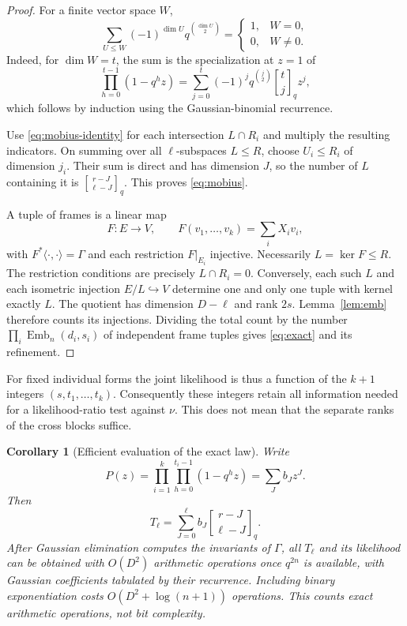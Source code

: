\documentclass[11pt,letterpaper]{article}
\newtheorem{corollary}[theorem]{Corollary}
\theoremstyle{definition}
\theoremstyle{remark}
\newcommand{\Emb}{\operatorname{Emb}}
\newcommand{\qb}[2]{\genfrac{[}{]}{0pt}{}{#1}{#2}_{q}}
\begin{document}
\begin{proof}
For a finite vector space $W$,
\begin{equation}\label{eq:mobius-identity}
 \sum_{U\le W}(-1)^{\dim U}q^{\binom{\dim U}2}
 =\begin{cases}1,&W=0,\\0,&W\ne0.\end{cases}
\end{equation}
Indeed, for $\dim W=t$, the sum is the specialization at $z=1$ of
\[
 \prod_{h=0}^{t-1}(1-q^h z)
 =\sum_{j=0}^t(-1)^jq^{\binom j2}\qb tjz^j,
\]
which follows by induction using the Gaussian-binomial recurrence.

Use \eqref{eq:mobius-identity} for each intersection $L\cap R_i$ and multiply the resulting indicators. On summing over all $\ell$-subspaces $L\le R$, choose $U_i\le R_i$ of dimension $j_i$. Their sum is direct and has dimension $J$, so the number of $L$ containing it is $\qb{r-J}{\ell-J}$. This proves \eqref{eq:mobius}.

A tuple of frames is a linear map
\[
 F:E\longrightarrow V,\qquad F(v_1,\ldots,v_k)=\sum_iX_i v_i,
\]
with $F^*\langle\cdot,\cdot\rangle=\Gamma$ and each restriction $F|_{E_i}$ injective. Necessarily $L=\ker F\le R$. The restriction conditions are precisely $L\cap R_i=0$. Conversely, each such $L$ and each isometric injection $E/L\hookrightarrow V$ determine one and only one tuple with kernel exactly $L$. The quotient has dimension $D-\ell$ and rank $2s$. Lemma~\ref{lem:emb} therefore counts its injections. Dividing the total count by the number $\prod_i\Emb_n(d_i,s_i)$ of independent frame tuples gives \eqref{eq:exact} and its refinement.
\end{proof}

For fixed individual forms the joint likelihood is thus a function of the $k+1$ integers $(s,t_1,\ldots,t_k)$. Consequently these integers retain all information needed for a likelihood-ratio test against $\nu$. This does not mean that the separate ranks of the cross blocks suffice.

\begin{corollary}[Efficient evaluation of the exact law]\label{cor:algorithm}
Write
\begin{equation}\label{eq:kernelpoly}
 P(z)=\prod_{i=1}^k\prod_{h=0}^{t_i-1}(1-q^h z)=\sum_J b_Jz^J.
\end{equation}
Then
\begin{equation}\label{eq:kernelpoly-T}
 T_\ell=\sum_{J=0}^{\ell}b_J\qb{r-J}{\ell-J}.
\end{equation}
After Gaussian elimination computes the invariants of $\Gamma$, all $T_\ell$ and its likelihood can be obtained with $O(D^2)$ arithmetic operations once $q^{2n}$ is available, with Gaussian coefficients tabulated by their recurrence. Including binary exponentiation costs $O(D^2+\log(n+1))$ operations. This counts exact arithmetic operations, not bit complexity.
\end{corollary}
\end{document}
